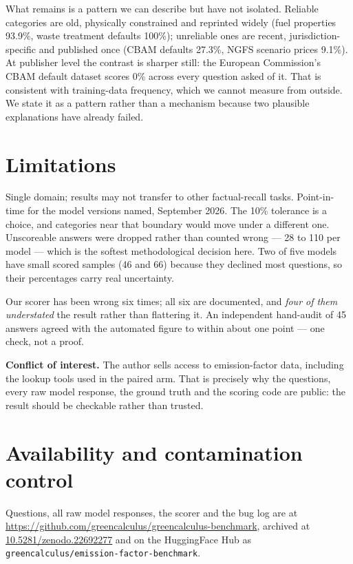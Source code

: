 \documentclass[10pt,a4paper]{article}
\begin{document}
What remains is a pattern we can describe but have not isolated. Reliable categories are old, physically constrained and reprinted widely (fuel properties 93.9\%, waste treatment defaults 100\%); unreliable ones are recent, jurisdiction-specific and published once (CBAM defaults 27.3\%, NGFS scenario prices 9.1\%). At publisher level the contrast is sharper still: the European Commission's CBAM default dataset scores 0\% across every question asked of it. That is consistent with training-data frequency, which we cannot measure from outside. We state it as a pattern rather than a mechanism because two plausible explanations have already failed.

\vspace{-0.3em}
\section{Limitations}

Single domain; results may not transfer to other factual-recall tasks. Point-in-time for the model versions named, September 2026. The 10\% tolerance is a choice, and categories near that boundary would move under a different one. Unscoreable answers were dropped rather than counted wrong --- 28 to 110 per model --- which is the softest methodological decision here. Two of five models have small scored samples (46 and 66) because they declined most questions, so their percentages carry real uncertainty.

Our scorer has been wrong six times; all six are documented, and \emph{four of them understated} the result rather than flattering it. An independent hand-audit of 45 answers agreed with the automated figure to within about one point --- one check, not a proof.

\textbf{Conflict of interest.} The author sells access to emission-factor data, including the lookup tools used in the paired arm. That is precisely why the questions, every raw model response, the ground truth and the scoring code are public: the result should be checkable rather than trusted.

\vspace{-0.3em}
\section{Availability and contamination control}

Questions, all raw model responses, the scorer and the bug log are at \url{https://github.com/greencalculus/greencalculus-benchmark}, archived at \href{https://doi.org/10.5281/zenodo.22692277}{10.5281/zenodo.22692277} and on the HuggingFace Hub as \texttt{greencalculus/emission-factor-benchmark}.
\end{document}
